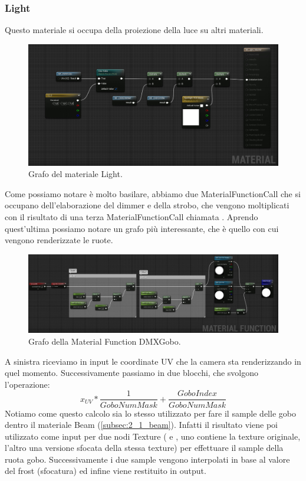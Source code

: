 \documentclass[main.tex]{subfiles}
\begin{document}
\subsubsection{Light}\label{subsec:2_1_light}
Questo materiale si occupa della proiezione della luce su altri materiali.
\begin{figure}[H]
    \centering
    \includegraphics[width=1\linewidth]{img/renderingPipeline/LightMaterialFull.jpg}
    \caption{Grafo del materiale Light.}
    \label{fig:2_lightGraphFull}
\end{figure}
\noindent Come possiamo notare è molto basilare, abbiamo due MaterialFunctionCall che si occupano dell'elaborazione del dimmer e della strobo, che vengono moltiplicati con il risultato di una terza MaterialFunctionCall chiamata . Aprendo quest'ultima possiamo notare un grafo più interessante, che è quello con cui vengono renderizzate le ruote.
\begin{figure}[H]
    \centering
    \includegraphics[width=1\linewidth]{img/renderingPipeline/DMXGoboMFFull.jpg}
    \caption{Grafo della Material Function DMXGobo.}
    \label{fig:2_dmxGoboGraphFull}
\end{figure}
\noindent A sinistra riceviamo in input le coordinate UV che la camera sta renderizzando in quel momento. Successivamente passiamo in due blocchi, che svolgono l'operazione:
\[x_{UV} * \frac{1}{GoboNumMask} + \frac{GoboIndex}{GoboNumMask}\]
Notiamo come questo calcolo sia lo stesso utilizzato per fare il sample delle gobo dentro il materiale Beam (\ref{subsec:2_1_beam}). Infatti il risultato viene poi utilizzato come input per due nodi Texture ( e , uno contiene la texture originale, l'altro una versione sfocata della stessa texture) per effettuare il sample della ruota gobo. Successivamente i due sample vengono interpolati in base al valore del frost (sfocatura) ed infine viene restituito in output.
\end{document}
